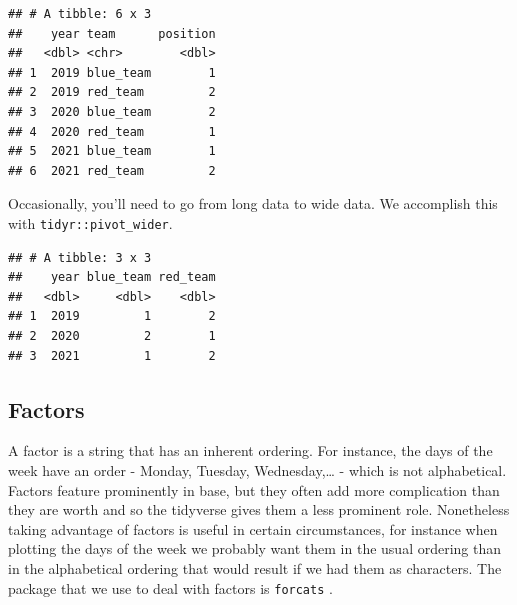 \documentclass[
]{book}
\newenvironment{Shaded}{\begin{snugshade}}{\end{snugshade}}
\newcommand{\DataTypeTok}[1]{\textcolor[rgb]{0.13,0.29,0.53}{#1}}
\newcommand{\KeywordTok}[1]{\textcolor[rgb]{0.13,0.29,0.53}{\textbf{#1}}}
\newcommand{\NormalTok}[1]{#1}
\newcommand{\OperatorTok}[1]{\textcolor[rgb]{0.81,0.36,0.00}{\textbf{#1}}}
\newcommand{\StringTok}[1]{\textcolor[rgb]{0.31,0.60,0.02}{#1}}
\begin{document}
\begin{verbatim}
## # A tibble: 6 x 3
##    year team      position
##   <dbl> <chr>        <dbl>
## 1  2019 blue_team        1
## 2  2019 red_team         2
## 3  2020 blue_team        2
## 4  2020 red_team         1
## 5  2021 blue_team        1
## 6  2021 red_team         2
\end{verbatim}

Occasionally, you'll need to go from long data to wide data. We accomplish this with \texttt{tidyr::pivot\_wider}.

\begin{Shaded}
\end{Shaded}

\begin{verbatim}
## # A tibble: 3 x 3
##    year blue_team red_team
##   <dbl>     <dbl>    <dbl>
## 1  2019         1        2
## 2  2020         2        1
## 3  2021         1        2
\end{verbatim}

\hypertarget{factors}{%
\subsection{Factors}\label{factors}}

A factor is a string that has an inherent ordering. For instance, the days of the week have an order - Monday, Tuesday, Wednesday,\ldots{} - which is not alphabetical. Factors feature prominently in base, but they often add more complication than they are worth and so the tidyverse gives them a less prominent role. Nonetheless taking advantage of factors is useful in certain circumstances, for instance when plotting the days of the week we probably want them in the usual ordering than in the alphabetical ordering that would result if we had them as characters. The package that we use to deal with factors is \texttt{forcats} \citep{citeforcats}.
\end{document}
